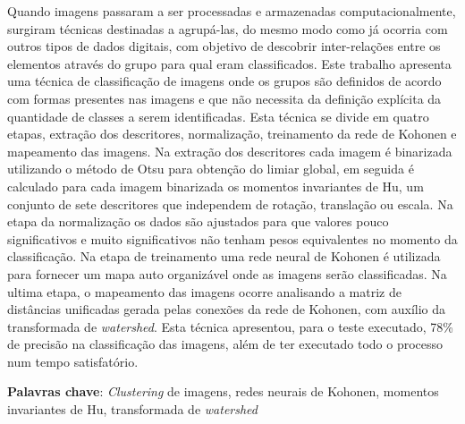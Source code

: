 \begin{resumo}
Quando imagens passaram a ser processadas e armazenadas computacionalmente,
surgiram técnicas destinadas a agrupá-las, do mesmo modo como já ocorria com
outros tipos de dados digitais, com objetivo de descobrir inter-relações entre
os elementos através do grupo para qual eram classificados. Este trabalho
apresenta uma técnica de classificação de imagens onde os grupos são definidos
de acordo com formas presentes nas imagens e que não necessita da definição
explícita da quantidade de classes a serem identificadas. Esta técnica se
divide em quatro etapas, extração dos descritores, normalização, treinamento
da rede de Kohonen e mapeamento das imagens. Na extração dos descritores cada
imagem é binarizada utilizando o método de Otsu para obtenção do limiar
global, em seguida é calculado para cada imagem binarizada os momentos
invariantes de Hu, um conjunto de sete descritores que independem de rotação,
translação ou escala. Na etapa da normalização os dados são ajustados para que
valores pouco significativos e muito significativos não tenham pesos
equivalentes no momento da classificação. Na etapa de treinamento uma rede
neural de Kohonen é utilizada para fornecer um mapa auto organizável onde as
imagens serão classificadas. Na ultima etapa, o mapeamento das imagens ocorre
analisando a matriz de distâncias unificadas gerada pelas conexões da rede de
Kohonen, com auxílio da transformada de \textit{watershed}. Esta técnica
apresentou, para o teste executado, 78\% de precisão na classificação das
imagens, além de ter executado todo o processo num tempo satisfatório.

\textbf{Palavras chave}: \textit{Clustering} de imagens, redes neurais de
Kohonen, momentos invariantes de Hu, transformada de \textit{watershed}
\end{resumo}
